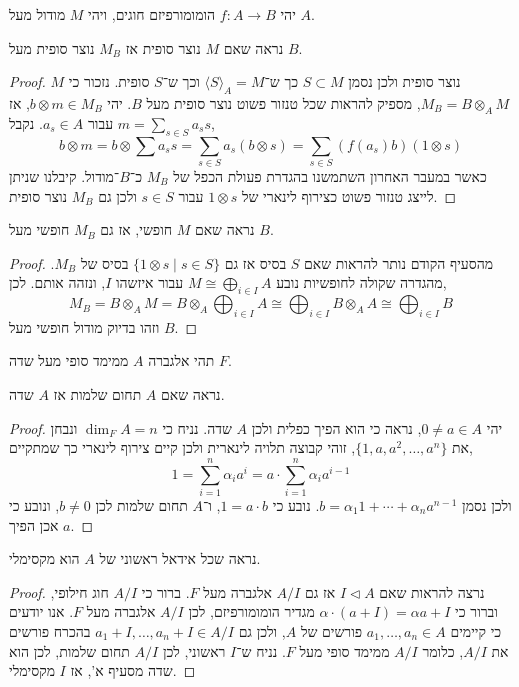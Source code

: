 \question{}
יהי $f : A \to B$ הומומורפיזם חוגים, ויהי $M$ מודול מעל $A$.

\subquestion{}
נראה שאם $M$ נוצר סופית אז $M_B$ נוצר סופית מעל $B$.
\begin{proof}
	$M$ נוצר סופית ולכן נסמן $S \subset M$ כך ש־$\langle S \rangle_A = M$ וכך ש־$S$ סופית.
	נזכור כי $M_B = B \otimes_A M$, מספיק להראות שכל טנזור פשוט נוצר סופית מעל $B$.
	יהי $b \otimes m \in M_B$, אז $m = \sum_{s \in S} a_s s$ עבור $a_s \in A$.
	נקבל,
	\[
		b \otimes m
		= b \otimes \sum a_s s
		= \sum_{s \in S} a_s (b \otimes s)
		= \sum_{s \in S} (f(a_s) b) (1 \otimes s)
	\]
	כאשר במעבר האחרון השתמשנו בהגדרת פעולת הכפל של $M_B$ כ־$B$־מודול.
	קיבלנו שניתן לייצג טנזור פשוט כצירוף לינארי של $1 \otimes s$ עבור $s \in S$ ולכן גם $M_B$ נוצר סופית.
\end{proof}

\subquestion{}
נראה שאם $M$ חופשי, אז גם $M_B$ חופשי מעל $B$.
\begin{proof}
	מהסעיף הקודם נותר להראות שאם $S$ בסיס אז גם $\{ 1 \otimes s \mid s \in S \}$ בסיס של $M_B$.
	מהגדרה שקולה לחופשיות נובע $M \cong \bigoplus_{i \in I} A$ עבור איזשהו $I$, ונזהה אותם.
	לכן,
	\[
		M_B
		= B \otimes_A M
		= B \otimes_A \bigoplus_{i \in I} A
		\cong \bigoplus_{i \in I} B \otimes_A A
		\cong \bigoplus_{i \in I} B
	\]
	וזהו בדיוק מודול חופשי מעל $B$.
\end{proof}

\question[7]{}
תהי אלגברה $A$ ממימד סופי מעל שדה $F$.

\subquestion{}
נראה שאם $A$ תחום שלמות אז $A$ שדה.
\begin{proof}
	יהי $0 \ne a \in A$, נראה כי הוא הפיך כפלית ולכן $A$ שדה.
	נניח כי $\dim_F A = n$ ונבחן את $\{ 1, a, a^2, \ldots, a^n \}$, זוהי קבוצה תלויה לינארית ולכן קיים צירוף לינארי כך שמתקיים,
	\[
		1
		= \sum_{i = 1}^n \alpha_i a^i
		= a \cdot \sum_{i = 1}^n \alpha_i a^{i - 1}
	\]
	ולכן נסמן $b = \alpha_1 1 + \cdots + \alpha_n a^{n - 1}$.
	נובע כי $1 = a \cdot b$, ו־$A$ תחום שלמות לכן $b \ne 0$, ונובע כי $a$ אכן הפיך.
\end{proof}

\subquestion{}
נראה שכל אידאל ראשוני של $A$ הוא מקסימלי.
\begin{proof}
	נרצה להראות שאם $I \triangleleft A$ אז גם $A / I$ אלגברה מעל $F$.
	ברור כי $A / I$ חוג חילופי, וברור כי $\alpha \cdot (a + I) = \alpha a + I$ מגדיר הומומורפיזם, לכן $A / I$ אלגברה מעל $F$.
	אנו יודעים כי קיימים $a_1, \ldots, a_n \in A$ פורשים של $A$, ולכן גם $a_1 + I, \ldots, a_n + I \in A / I$ בהכרח פורשים את $A / I$, כלומר $A / I$ ממימד סופי מעל $F$.
	נניח ש־$I$ ראשוני, לכן $A / I$ תחום שלמות, לכן הוא שדה מסעיף א', אז $I$ מקסימלי.
\end{proof}


